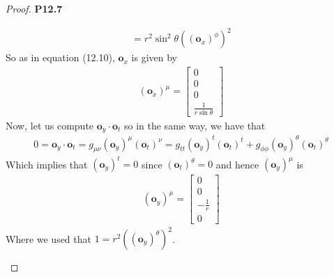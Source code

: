 \documentclass[11pt]{article}
\theoremstyle{definition}
\begin{document}
\begin{proof}{\textbf{P12.7}}
\begin{itemize}
\begin{align*}
        = r^2\sin^2\theta ((\bm{o}_x)^\phi)^2
    \end{align*}
    So as in equation (12.10), $\bm{o}_x$ is given by
    \begin{align*}
        (\bm{o}_x)^\mu = \begin{bmatrix}
            0\\ 0  \\ 0 \\ \frac{1}{r\sin\theta}
        \end{bmatrix}
    \end{align*}
    Now, let us compute $\bm{o}_y \cdot \bm{o}_t$ so in the same way, we have
    that
    \begin{align*}
        0 = \bm{o}_y \cdot \bm{o}_t
        = g_{\mu\nu} (\bm{o}_y)^\mu(\bm{o}_t)^\nu
        = g_{tt} (\bm{o}_y)^t(\bm{o}_t)^t
        + g_{\phi\phi} (\bm{o}_y)^\theta(\bm{o}_t)^\theta
    \end{align*}
    Which implies that $(\bm{o}_y)^t = 0$ since $(\bm{o}_t)^\theta = 0$
    and hence $(\bm{o}_y)^\mu$ is 
    \begin{align*}
        (\bm{o}_y)^\mu = \begin{bmatrix}
            0\\ 0  \\ -\frac{1}{r} \\ 0
        \end{bmatrix}
    \end{align*}
    Where we used that $1 = r^2 ((\bm{o}_y)^\theta)^2$.


\end{itemize}
\end{proof}
\end{document}
